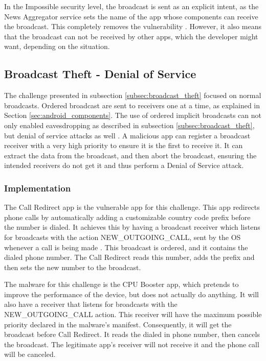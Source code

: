     In the Impossible security level, the broadcast is sent as an explicit intent, as the News Aggregator service sets the name of the app whose components can receive the broadcast. This completely removes the vulnerability \cite{2010_icc_paper}. However, it also means that the broadcast can not be received by other apps, which the developer might want, depending on the situation.
    
    \subsection{Broadcast Theft - Denial of Service}
        \label{subsec:broadcast_theft_dos}
        
    The challenge presented in subsection \ref{subsec:broadcast_theft} focused on normal broadcasts. Ordered broadcast are sent to receivers one at a time, as explained in Section \ref{sec:android_components}. The use of ordered implicit broadcasts can not only enabled eavesdropping as described in subsection \ref{subsec:broadcast_theft}, but denial of service attacks as well \cite{2010_icc_paper}. A malicious app can register a broadcast receiver with a very high priority to ensure it is the first to receive it. It can extract the data from the broadcast, and then abort the broadcast, ensuring the intended receivers do not get it and thus perform a Denial of Service attack.
    
    \subsubsection{Implementation}
        \label{subsubsec:broadcast_theft_dos_implementation}

    The Call Redirect app is the vulnerable app for this challenge. This app redirects phone calls by automatically adding a customizable country code prefix before the number is dialed. It achieves this by having a broadcast receiver which listens for broadcasts with the action NEW\_OUTGOING\_CALL, sent by the OS whenever a call is being made \cite{intents}. This broadcast is ordered, and it contains the dialed phone number. The Call Redirect reads this number, adds the prefix and then sets the new number to the broadcast.
    
    The malware for this challenge is the CPU Booster app, which pretends to improve the performance of the device, but does not actually do anything. It will also have a receiver that listens for broadcasts with the NEW\_OUTGOING\_CALL action. This receiver will have the maximum possible priority declared in the malware's manifest. Consequently, it will get the broadcast before Call Redirect. It reads the dialed in phone number, then cancels the broadcast. The legitimate app's receiver will not receive it and the phone call will be canceled.
    
